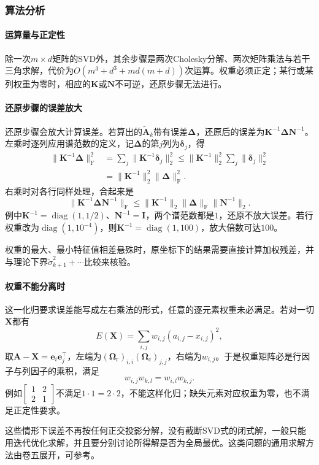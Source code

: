 \subsubsection{算法分析}

\paragraph{运算量与正定性}
除一次$m\times d$矩阵的SVD外，其余步骤是两次Cholesky分解、两次矩阵乘法与若干三角求解，代价为$O(m^3+d^3+md(m+d))$次运算。权重必须正定；某行或某列权重为零时，相应的$\bm K$或$\bm N$不可逆，还原步骤无法进行。

\paragraph{还原步骤的误差放大}
还原步骤会放大计算误差。若算出的$\widetilde{\bm A}_k$带有误差$\bm\Delta$，还原后的误差为$\bm K^{-1}\bm\Delta\bm N^{-1}$。左乘时逐列应用谱范数的定义，记$\bm\Delta$的第$j$列为$\bm\delta_j$，得
\[
 \begin{aligned}
 \lVert\bm K^{-1}\bm\Delta\rVert_{\mathrm F}^2&=\sum_j\lVert\bm K^{-1}\bm\delta_j\rVert_2^2
 \leq\lVert\bm K^{-1}\rVert_2^2\sum_j\lVert\bm\delta_j\rVert_2^2\\
 &=\lVert\bm K^{-1}\rVert_2^2\lVert\bm\Delta\rVert_{\mathrm F}^2 .
 \end{aligned}
\]
右乘时对各行同样处理，合起来是
\begin{equation}
 \lVert\bm K^{-1}\bm\Delta\bm N^{-1}\rVert_{\mathrm F}\leq\lVert\bm K^{-1}\rVert_2\lVert\bm\Delta\rVert_{\mathrm F}\lVert\bm N^{-1}\rVert_2 .
 \label{eq:matrix-approximation-weighted-recovery-error}
\end{equation}
例中$\bm K^{-1}=\operatorname{diag}(1,1/2)$、$\bm N^{-1}=\bm I$，两个谱范数都是$1$，还原不放大误差。若行权重改为$\operatorname{diag}(1,10^{-4})$，则$\bm K^{-1}=\operatorname{diag}(1,100)$，放大倍数可达$100$。

权重的最大、最小特征值相差悬殊时，原坐标下的结果需要直接计算加权残差，并与理论下界$\tilde\sigma_{k+1}^2+\cdots$比较来核验。

\paragraph{权重不能分离时}
这一化归要求误差能写成左右乘法的形式，任意的逐元素权重未必满足。若对一切$\bm X$都有
\[
 E(\bm X)=\sum_{i,j}w_{i,j}(a_{i,j}-x_{i,j})^2 ,
\]
取$\bm A-\bm X=\bm e_i\bm e_j^\top$，左端为$(\bm\Omega_{\mathrm r})_{i,i}(\bm\Omega_{\mathrm c})_{j,j}$，右端为$w_{i,j}$。于是权重矩阵必是行因子与列因子的乘积，满足
\begin{equation}
 w_{i,j}w_{k,l}=w_{i,l}w_{k,j} .
 \label{eq:matrix-approximation-separable-weights}
\end{equation}
例如$\left[\begin{smallmatrix}1&2\\2&1\end{smallmatrix}\right]$不满足$1\cdot1=2\cdot2$，不能这样化归；缺失元素对应权重为零，也不满足正定性要求。

这些情形下误差不再按任何正交投影分解，没有截断SVD式的闭式解，一般只能用迭代优化求解，并且要分别讨论所得解是否为全局最优。这类问题的通用求解方法由卷五展开，可参考。
